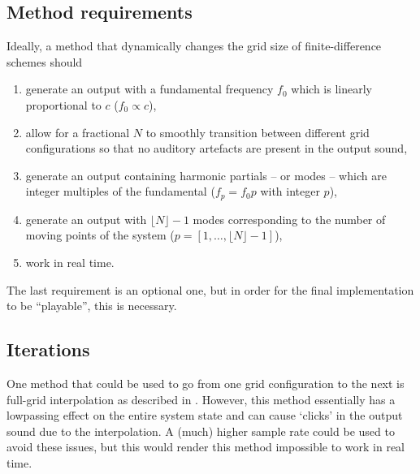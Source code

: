 \subsection{Method requirements}\label{sec:methodReq}
Ideally, a method that dynamically changes the grid size of finite-difference schemes should
\begin{enumerate}
    \item generate an output with a fundamental frequency $f_0$ %
    which is linearly proportional to $c$ ($f_0 \propto c$),
    \item allow for a fractional $N$ to smoothly transition 
    between different grid configurations so that no auditory artefacts are present in the output sound,
    \item generate an output containing harmonic partials -- or modes -- which are integer multiples of the fundamental ($f_p = f_0 p$ with integer $p$),
    \item generate an output with $\lfloor N\rfloor-1$ modes corresponding to the number of moving points of the system ($p = [1, \hdots, \lfloor N\rfloor-1]$),\\
    \item work in real time.
\end{enumerate}
The last requirement is an optional one, but in order for the final implementation to be ``playable'', this is necessary. 
%

\subsection{Iterations }\label{sec:iterations} 
One method that could be used to go from one grid configuration to the next is full-grid interpolation as described in \cite[Chap. 5]{bilbao2009}. However, this method essentially has a lowpassing effect on the entire system state and can cause `clicks' in the output sound due to the interpolation. A (much) higher sample rate could be used to avoid these issues, but this would render this method impossible to work in real time.

